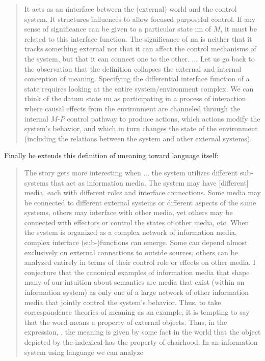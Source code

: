 {\begin{quote}
It acts as an \i{interface} between the (external) world
and the control system. It structures influences to allow
focused purposeful control. If any sense of significance
can be given to a particular state \i{m} of $M$, it must
be related to this interface function. The significance
of \i{m} is neither that it tracks something external nor
that it can affect the control mechanisms of the system,
but that it can connect one to the other. ... Let us go
back to the observation that the definition
collapses the external and internal conception of meaning.
Specifying the differential interface function of a
state requires looking at the entire system/environment
complex.  We can think of the datum state \i{m} as participating
in a process of interaction where causal effects
from the environment are channeled through the internal
$M$-$P$ control pathway to produce actions, which actions
modify the system's behavior, and which in turn
changes the state of the environment (including the relations
between the system and other external systems).
\cite[pp. 15-16]{OrlinVakarelov}
\end{quote}
Finally he extends this definition of \i{meaning}
toward language itself:
\begin{quote}The story gets more interesting when ...
the system utilizes different sub-systems that act
as information media.  The system may have [different] media, each
with different roles and interface connections.  Some media
may be connected to different external systems or
different aspects of the same systems, others may interface
with other media, yet others may be connected
with effectors or control the states of other media, etc.
When the system is organized as a complex network of
information media, complex interface (sub-)functions
can emerge. Some can depend almost exclusively on
external connections to outside sources, others can be
analyzed entirely in terms of their control role or effects
on other media. I conjecture that the canonical
examples of information media that shape many of our
intuition about semantics are media that exist (within
an information system) as only one of a large network
of other information media that jointly control the system's
behavior. Thus, to take correspondence theories
of meaning as an example, it is tempting to say that
the word  means a property of external objects.
Thus, in the expression, , the meaning
is given by some fact in the world that the object depicted
by the indexical has the property of chairhood.
In an information system using language we can analyze

\end{quote}}
